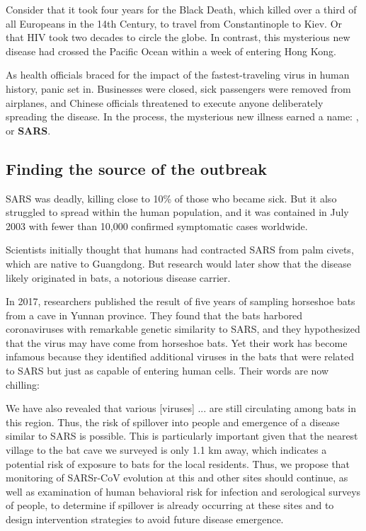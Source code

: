 Consider that it took four years for the Black Death, which killed over a third of all Europeans in the 14th Century, to travel from Constantinople to Kiev. Or that HIV took two decades to circle the globe. In contrast, this mysterious new disease had crossed the Pacific Ocean within a week of entering Hong Kong.

As health officials braced for the impact of the fastest-traveling virus in human history, panic set in. Businesses were closed, sick passengers were removed from airplanes, and Chinese officials threatened to execute anyone deliberately spreading the disease. In the process, the mysterious new illness earned a name: , or \textbf{SARS}.

\FloatBarrier
{}
\subsection{Finding the source of the outbreak}

SARS was deadly, killing close to 10\% of those who became sick. But it also struggled to spread within the human population, and it was contained in July 2003 with fewer than 10,000 confirmed symptomatic cases worldwide.

Scientists initially thought that humans had contracted SARS from palm civets, which are native to Guangdong. But research would later show that the disease likely originated in bats, a notorious disease carrier.

In 2017, researchers published the result of five years of sampling horseshoe bats from a cave in Yunnan province. They found that the bats harbored coronaviruses with remarkable genetic similarity to SARS, and they hypothesized that the virus may have come from horseshoe bats. Yet their work has become infamous because they identified additional viruses in the bats that were related to SARS but just as capable of entering human cells. Their words are now chilling:

\begin{itquote}
	We have also revealed that various [viruses] ... are still circulating among bats in this region. Thus, the risk of spillover into people and emergence of a disease similar to SARS is possible. This is particularly important given that the nearest village to the bat cave we surveyed is only 1.1 km away, which indicates a potential risk of exposure to bats for the local residents. Thus, we propose that monitoring of SARSr-CoV evolution at this and other sites should continue, as well as examination of human behavioral risk for infection and serological surveys of people, to determine if spillover is already occurring at these sites and to design intervention strategies to avoid future disease emergence.
\end{itquote}

